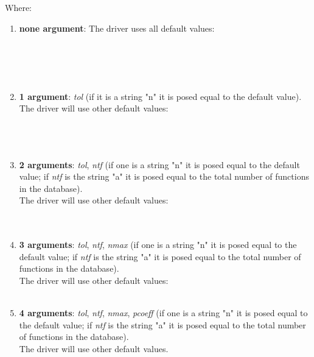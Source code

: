 \documentclass[10pt]{article}
\begin{document}
Where:
\begin{enumerate}
	\item \textbf{none argument}: The driver uses all default values:\\
	       \\
	       \\
	       \\
	       \\
	       

	\item \textbf{1 argument}: \emph{tol} (if it is a string "n" it is posed equal to the default value).\\ The driver will use other default values:\\
	      \\
	      \\
	      \\

	\item \textbf{2 arguments}: \emph{tol}, \emph{ntf} (if one is a string "n" it is posed equal to the default value; if \emph{ntf} is the string "a" it is posed equal to the total number of functions in the database). \\The driver will use other default values:\\
	      \\
	      \\

	\item \textbf{3 arguments}: \emph{tol}, \emph{ntf}, \emph{nmax} (if one is a string "n" it is posed equal to the default value; if \emph{ntf} is the string "a" it is posed equal to the total number of functions in the database). \\The driver will use other default values:\\
	      \\

	\item \textbf{4 arguments}: \emph{tol}, \emph{ntf}, \emph{nmax}, \emph{pcoeff} (if one is a string "n" it is posed equal to the default value; if \emph{ntf} is the string "a" it is posed equal to the total number of functions in the database). \\The driver will use other default values.\\


\end{enumerate}
\end{document}

